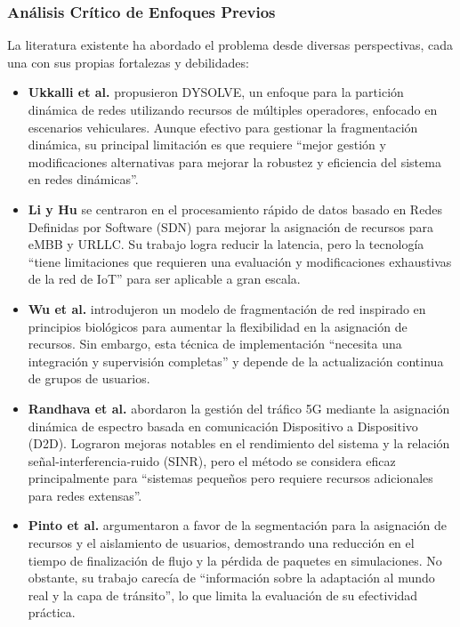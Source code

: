 \documentclass[12pt,a4paper]{article}
\begin{document}
\subsubsection{Análisis Crítico de Enfoques Previos}

La literatura existente ha abordado el problema desde diversas perspectivas, cada una con sus propias fortalezas y debilidades:

\begin{itemize}
    \item \textbf{Ukkalli et al.} propusieron DYSOLVE, un enfoque para la partición dinámica de redes utilizando recursos de múltiples operadores, enfocado en escenarios vehiculares. Aunque efectivo para gestionar la fragmentación dinámica, su principal limitación es que requiere ``mejor gestión y modificaciones alternativas para mejorar la robustez y eficiencia del sistema en redes dinámicas''.
    
    \item \textbf{Li y Hu} se centraron en el procesamiento rápido de datos basado en Redes Definidas por Software (SDN) para mejorar la asignación de recursos para eMBB y URLLC. Su trabajo logra reducir la latencia, pero la tecnología ``tiene limitaciones que requieren una evaluación y modificaciones exhaustivas de la red de IoT'' para ser aplicable a gran escala.
    
    \item \textbf{Wu et al.} introdujeron un modelo de fragmentación de red inspirado en principios biológicos para aumentar la flexibilidad en la asignación de recursos. Sin embargo, esta técnica de implementación ``necesita una integración y supervisión completas'' y depende de la actualización continua de grupos de usuarios.
    
    \item \textbf{Randhava et al.} abordaron la gestión del tráfico 5G mediante la asignación dinámica de espectro basada en comunicación Dispositivo a Dispositivo (D2D). Lograron mejoras notables en el rendimiento del sistema y la relación señal-interferencia-ruido (SINR), pero el método se considera eficaz principalmente para ``sistemas pequeños pero requiere recursos adicionales para redes extensas''.
    
    \item \textbf{Pinto et al.} argumentaron a favor de la segmentación para la asignación de recursos y el aislamiento de usuarios, demostrando una reducción en el tiempo de finalización de flujo y la pérdida de paquetes en simulaciones. No obstante, su trabajo carecía de ``información sobre la adaptación al mundo real y la capa de tránsito'', lo que limita la evaluación de su efectividad práctica.
\end{itemize}
\end{document}
